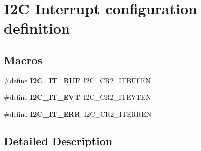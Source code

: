 \hypertarget{group___i2_c___interrupt__configuration__definition}{}\section{I2C Interrupt configuration definition}
\label{group___i2_c___interrupt__configuration__definition}
\subsection*{Macros}
\begin{DoxyCompactItemize}
\item 
\mbox{\label{group___i2_c___interrupt__configuration__definition_gad3ff3f405b882aa4d2f91310aa1cc0df}} 
\#define {\bfseries I2\+C\+\_\+\+I\+T\+\_\+\+B\+UF}~I2\+C\+\_\+\+C\+R2\+\_\+\+I\+T\+B\+U\+F\+EN
\item 
\mbox{\label{group___i2_c___interrupt__configuration__definition_gadd59efa313e1598a084a1e5ec3905b02}} 
\#define {\bfseries I2\+C\+\_\+\+I\+T\+\_\+\+E\+VT}~I2\+C\+\_\+\+C\+R2\+\_\+\+I\+T\+E\+V\+T\+EN
\item 
\mbox{\label{group___i2_c___interrupt__configuration__definition_gadba3667b439cbf4ba1e6e9aec961ab03}} 
\#define {\bfseries I2\+C\+\_\+\+I\+T\+\_\+\+E\+RR}~I2\+C\+\_\+\+C\+R2\+\_\+\+I\+T\+E\+R\+R\+EN
\end{DoxyCompactItemize}


\subsection{Detailed Description}
